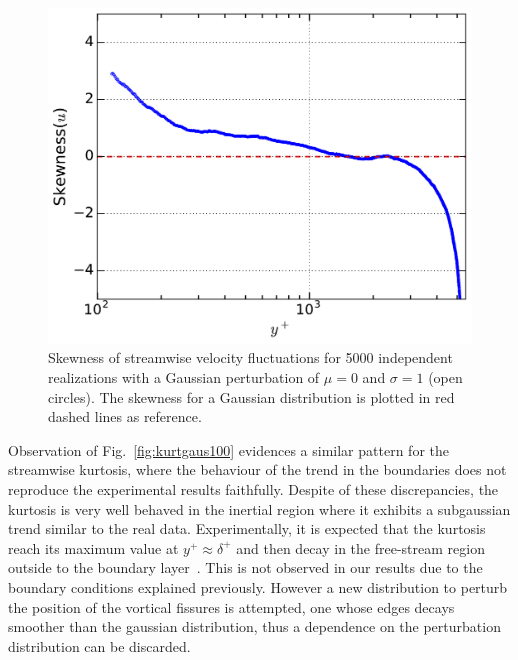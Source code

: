 \documentclass[aps,reprint,amsmath,amssymb,pra]{revtex4-1}%
\begin{document}
\begin{figure}[tb]
\includegraphics[scale=0.46]{figures/skewness_5000_assembles_gauss100}
\caption{\label{fig:skewgaus100} Skewness of streamwise velocity fluctuations for 5000 independent realizations with a Gaussian perturbation of $\mu=0$ and $\sigma=1$ (open circles). The skewness for a Gaussian distribution is plotted in red dashed lines as reference.}
\end{figure}
Observation of Fig.~\ref{fig:kurtgaus100} evidences a similar pattern for the streamwise kurtosis, where the behaviour of the trend in the boundaries does not reproduce the experimental results faithfully. Despite of these discrepancies, the kurtosis is very well behaved in the inertial region where it exhibits a subgaussian trend similar to the real data. Experimentally, it is expected that the kurtosis reach its maximum value at $y^+\approx\delta^+$ and then decay in the free-stream region outside to the boundary layer~\cite{Vincenti2013}. This is not observed in our results due to the boundary conditions explained previously. However a new distribution to perturb the position of the vortical fissures is attempted, one whose edges decays smoother than the gaussian distribution, thus a dependence on the perturbation distribution can be discarded.
\end{document}
